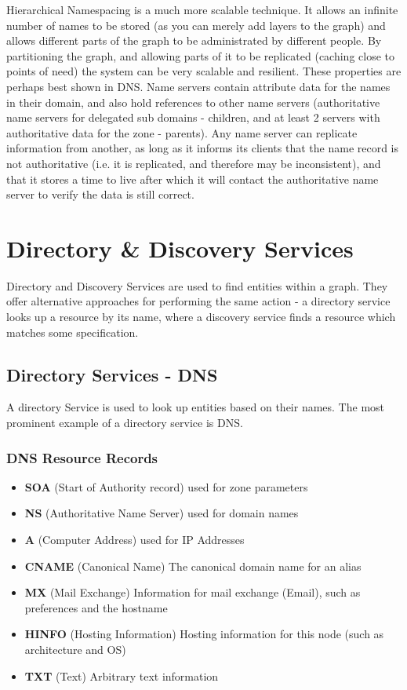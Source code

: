 \documentclass{article}
\begin{document}
Hierarchical Namespacing is a much more scalable technique. It allows an infinite number of names to be stored (as you can merely add layers to the graph) and allows different parts of the graph to be administrated by different people. By partitioning the graph, and allowing parts of it to be replicated (caching close to points of need) the system can be very scalable and resilient. These properties are perhaps best shown in DNS. Name servers contain attribute data for the names in their domain, and also hold references to other name servers (authoritative name servers for delegated sub domains - children, and at least 2 servers with authoritative data for the zone - parents). Any name server can replicate information from another, as long as it informs its clients that the name record is not authoritative (i.e. it is replicated, and therefore may be inconsistent), and that it stores a time to live after which it will contact the authoritative name server to verify the data is still correct. 

\section{Directory \& Discovery Services}
Directory and Discovery Services are used to find entities within a graph. They offer alternative approaches for performing the same action - a directory service looks up a resource by its name, where a discovery service finds a resource which matches some specification. 

\subsection{Directory Services - DNS}
A directory Service is used to look up entities based on their names. The most prominent example of a directory service is DNS.

\subsubsection {DNS Resource Records}
\begin{itemize}
    \item \textbf{SOA} (Start of Authority record) used for zone parameters
    \item \textbf{NS} (Authoritative Name Server) used for domain names
    \item \textbf{A} (Computer Address) used for IP Addresses
    \item \textbf{CNAME} (Canonical Name) The canonical domain name for an alias
    \item \textbf{MX} (Mail Exchange) Information for mail exchange (Email), such as preferences and the hostname
    \item \textbf{HINFO} (Hosting Information) Hosting information for this node (such as architecture and OS)
    \item \textbf{TXT} (Text) Arbitrary text information
\end{itemize}
\end{document}
